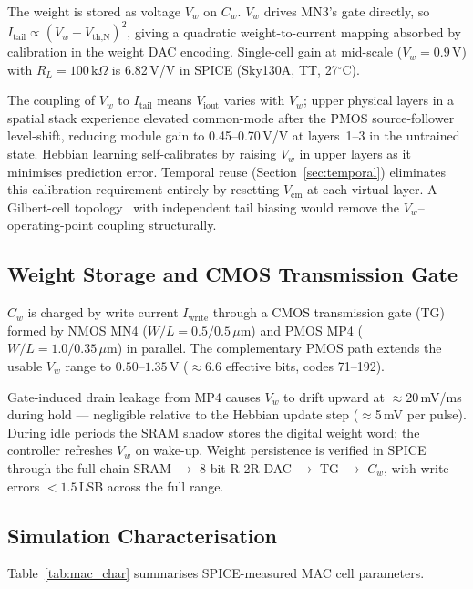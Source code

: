 \documentclass[journal,10pt,twoside]{IEEEtran}
\begin{document}
The weight is stored as voltage $V_w$ on $C_w$.
$V_w$ drives MN3's gate directly, so
$I_\text{tail} \propto (V_w - V_\text{th,N})^2$,
giving a quadratic weight-to-current mapping absorbed by calibration in
the weight DAC encoding.
Single-cell gain at mid-scale ($V_w = 0.9\,\text{V}$) with
$R_L = 100\,\text{k}\Omega$ is 6.82\,V/V in SPICE (Sky130A, TT, 27$^\circ$C).

The coupling of $V_w$ to $I_\text{tail}$ means $V_\text{iout}$ varies with
$V_w$; upper physical layers in a spatial stack experience elevated
common-mode after the PMOS source-follower level-shift, reducing module
gain to 0.45--0.70\,V/V at layers~1--3 in the untrained state.
Hebbian learning self-calibrates by raising $V_w$ in upper layers as it
minimises prediction error.
Temporal reuse (Section~\ref{sec:temporal}) eliminates this calibration
requirement entirely by resetting $V_\text{cm}$ at each virtual layer.
A Gilbert-cell topology~\cite{gilbert1968precise} with independent tail
biasing would remove the $V_w$--operating-point coupling structurally.

\subsection{Weight Storage and CMOS Transmission Gate}

$C_w$ is charged by write current $I_\text{write}$ through a CMOS
transmission gate (TG) formed by NMOS MN4 ($W/L = 0.5/0.5\,\mu\text{m}$)
and PMOS MP4 ($W/L = 1.0/0.35\,\mu\text{m}$) in parallel.
The complementary PMOS path extends the usable $V_w$ range to
$0.50\text{--}1.35\,\text{V}$ ($\approx$6.6 effective bits, codes 71--192).

Gate-induced drain leakage from MP4 causes $V_w$ to drift upward at
$\approx$20\,mV/ms during hold — negligible relative to the Hebbian update
step ($\approx$5\,mV per pulse).
During idle periods the SRAM shadow stores the digital weight word;
the controller refreshes $V_w$ on wake-up.
Weight persistence is verified in SPICE through the full chain
SRAM $\to$ 8-bit R-2R DAC $\to$ TG $\to$ $C_w$,
with write errors $<1.5$\,LSB across the full range.

\subsection{Simulation Characterisation}

Table~\ref{tab:mac_char} summarises SPICE-measured MAC cell parameters.
\end{document}
